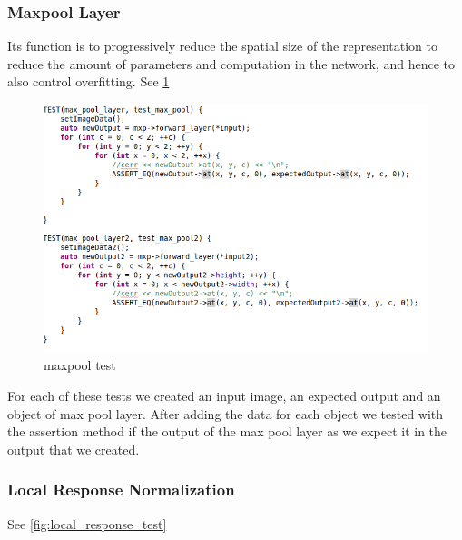 \documentclass[parskip=full]{scrartcl}
\begin{document}
\subsubsection{Maxpool Layer}
Its function is to progressively reduce the spatial size of the representation to reduce the amount of parameters and computation in the network, and hence to also control overfitting. See \ref{fig:maxpool_test} %

\begin{figure}[h]
		\centering
		\includegraphics[width=1\textwidth]{maxpool_test}
		\caption{maxpool test}
		\label{fig:maxpool_test}
\end{figure}

For each of these tests we created an input image, an expected output and an object of max pool layer. After adding the data for each object we tested with the assertion method if the output of the max pool layer as we expect it in the output that we created. 
\subsubsection{Local Response Normalization}
See \ref{fig:local_response_test}
\end{document}
